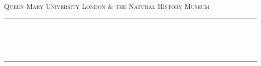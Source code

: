 \begin{titlepage}

\newcommand{\HRule}{\rule{\linewidth}{0.5mm}} %


 

\center %

\quad\\[1.5cm]
\textsc{\Large Queen Mary University London \& the Natural History Museum}\\[0.5cm] %

\makeatletter
\HRule \\[0.4cm]
{ \huge \bfseries \@title}\\[0.4cm] %
{ \huge \bfseries \@author}\\[0.4cm]
\HRule \\[1.5cm]
 


\end{titlepage}
